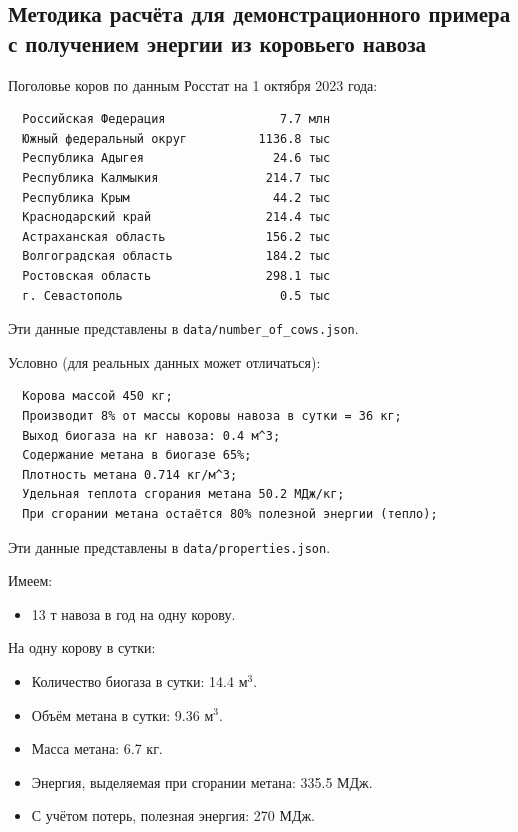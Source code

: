\documentclass[12pt,a4paper]{scrartcl}
\begin{document}
\subsection{Методика расчёта для демонстрационного примера с получением энергии из коровьего навоза}
\label{sec:desc:cm}

Поголовье коров по данным Росстат на 1 октября 2023 года:

\begin{verbatim}
  Российская Федерация                7.7 млн
  Южный федеральный округ          1136.8 тыс
  Республика Адыгея                  24.6 тыс
  Республика Калмыкия               214.7 тыс
  Республика Крым                    44.2 тыс
  Краснодарский край                214.4 тыс
  Астраханская область              156.2 тыс
  Волгоградская область             184.2 тыс
  Ростовская область                298.1 тыс
  г. Севастополь                      0.5 тыс
\end{verbatim}

Эти данные представлены в \texttt{data/number\_of\_cows.json}.

Условно (для реальных данных может отличаться):

\begin{verbatim}
  Корова массой 450 кг;
  Производит 8% от массы коровы навоза в сутки = 36 кг;
  Выход биогаза на кг навоза: 0.4 м^3;
  Содержание метана в биогазе 65%;
  Плотность метана 0.714 кг/м^3;
  Удельная теплота сгорания метана 50.2 МДж/кг;
  При сгорании метана остаётся 80% полезной энергии (тепло);
\end{verbatim}

Эти данные представлены в \texttt{data/properties.json}.

Имеем:
\begin{itemize}
  \item 13 т навоза в год на одну корову.
\end{itemize}

На одну корову в сутки:
\begin{itemize}
  \item Количество биогаза в сутки: 14.4 м\(^3\).
  \item Объём метана в сутки: 9.36 м\(^3\).
  \item Масса метана: 6.7 кг.
  \item Энергия, выделяемая при сгорании метана: 335.5 МДж.
  \item С учётом потерь, полезная энергия: 270 МДж.
\end{itemize}
\end{document}
